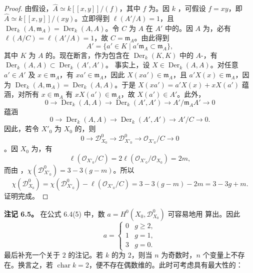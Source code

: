 \begin{proof}
由假设，$\widehat A\simeq k[[x,y]]/(f)$，其中 $f$ 为。因 $k$ ，可假设 $f=xy$，即 $\widehat A\simeq k[[x,y]]/(xy)$。立即得到 $\ell(A'/A)=1$，且 $\operatorname{Der}_k(A,\mathfrak m_A)=\operatorname{Der}_k(A,A)$。令 $C$ 为 $A$ 在 $A'$ 中的。因 $A$ 为，必有 $\ell(A/C)=\ell(A'/A)=1$，故 $C=\mathfrak m_A$。由此得到
\[
A'=\{a'\in K\mid a'\mathfrak m_A\subset\mathfrak m_A\},
\]
其中 $K$ 为 $A$ 的。现在断言，作为包含在 $\operatorname{Der}_k(K,K)$ 中的 $A$-，有
$\operatorname{Der}_k(A,A)\subset\operatorname{Der}_k(A',A')$。
事实上，设 $X\in\operatorname{Der}_k(A,A)$。对任意 $a'\in A'$ 及
$x\in\mathfrak m_A$，有 $xa'\in\mathfrak m_A$，因此 $X(xa')\in\mathfrak m_A$，且 $a'X(x)\in\mathfrak m_A$，因为 $\operatorname{Der}_k(A,\mathfrak m_A)=\operatorname{Der}_k(A,A)$。于是 $X(xa')=a'X(x)+xX(a')$ 蕴涵，对所有 $x\in\mathfrak m_A$ 有 $xX(a')\in\mathfrak m_A$，故 $X(a')\in A'$。此外，
\[
0\longrightarrow\operatorname{Der}_k(A,A)\longrightarrow\operatorname{Der}_k(A',A')
 \longrightarrow A'/\mathfrak m_A A'\longrightarrow0
\]
蕴涵
\[
0\longrightarrow\operatorname{Der}_k(A,A)\longrightarrow\operatorname{Der}_k(A',A')
 \longrightarrow A'/C\longrightarrow0.
\]
因此，若令 $X'_0$ 为 $X_0$ 的，则
\[
0\longrightarrow\mathcal D_{X_0}^0\longrightarrow\mathcal D_{X'_0}^0
 \longrightarrow\mathcal O_{X'_0}/C\longrightarrow0
\]
。因 $X_0$ 为，有
\[
\ell(\mathcal O_{X'_0}/C)=2\ell(\mathcal O_{X'_0}/\mathcal O_{X_0})=2m,
\]
而由 ，$\chi(\mathcal D_{X'_0}^0)=3-3(g-m)$。所以
\[
\chi(\mathcal D_{X_0}^0)=\chi(\mathcal D_{X'_0}^0)-\ell(\mathcal O_{X'_0}/C)
 =3-3(g-m)-2m=3-3g+m.
\]
证明完成。
\end{proof}

\textbf{注记 6.5。} 在公式 6.4(5) 中，数 $a=H^0(X_0,\mathcal D_{X_0}^0)$ 可容易地用 算出。因此
\[
a=\begin{cases}
0&g\geq2,\\
1&g=1,\\
3&g=0.
\end{cases}
\]
最后补充一个关于 $2$ 的注记。若 $k$ 的为 $2$，则当 $n$ 为奇数时，$n$ 个变量上不存在。换言之，若 $\operatorname{char}k=2$，便不存在偶数维的。此时可考虑具有最大性的：

